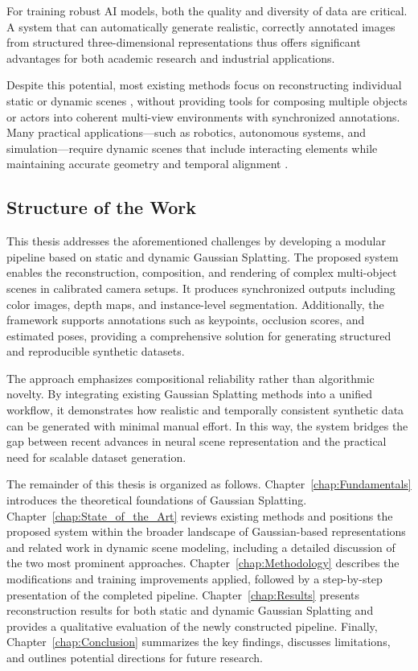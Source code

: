 For training robust AI models, both the quality and diversity of data are critical. A system that can automatically generate realistic, correctly annotated images from structured three-dimensional representations thus offers significant advantages for both academic research and industrial applications.

Despite this potential, most existing methods focus on reconstructing individual static or dynamic scenes \cite{luiten2024dynamic,yang2024deformable}, without providing tools for composing multiple objects or actors into coherent multi-view environments with synchronized annotations. Many practical applications—such as robotics, autonomous systems, and simulation—require dynamic scenes that include interacting elements while maintaining accurate geometry and temporal alignment \cite{CutAndSplat2024}.

\subsection{Structure of the Work}
This thesis addresses the aforementioned challenges by developing a modular pipeline based on static and dynamic Gaussian Splatting. The proposed system enables the reconstruction, composition, and rendering of complex multi-object scenes in calibrated camera setups. It produces synchronized outputs including color images, depth maps, and instance-level segmentation. Additionally, the framework supports annotations such as keypoints, occlusion scores, and estimated poses, providing a comprehensive solution for generating structured and reproducible synthetic datasets.

The approach emphasizes compositional reliability rather than algorithmic novelty. By integrating existing Gaussian Splatting methods into a unified workflow, it demonstrates how realistic and temporally consistent synthetic data can be generated with minimal manual effort. In this way, the system bridges the gap between recent advances in neural scene representation and the practical need for scalable dataset generation.

The remainder of this thesis is organized as follows. Chapter~\ref{chap:Fundamentals} introduces the theoretical foundations of Gaussian Splatting. Chapter~\ref{chap:State_of_the_Art} reviews existing methods and positions the proposed system within the broader landscape of Gaussian-based representations and related work in dynamic scene modeling, including a detailed discussion of the two most prominent approaches. Chapter~\ref{chap:Methodology} describes the modifications and training improvements applied, followed by a step-by-step presentation of the completed pipeline. Chapter~\ref{chap:Results} presents reconstruction results for both static and dynamic Gaussian Splatting and provides a qualitative evaluation of the newly constructed pipeline. Finally, Chapter~\ref{chap:Conclusion} summarizes the key findings, discusses limitations, and outlines potential directions for future research.
